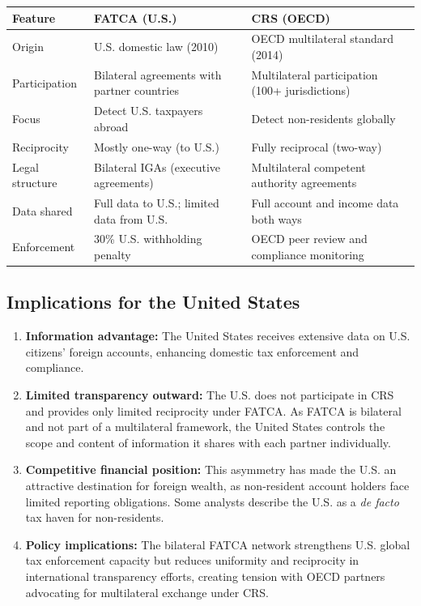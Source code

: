 \documentclass[12pt]{article}
\begin{document}
\begin{table}[h!]
\centering
\begin{tabular}{p{3.2cm} p{5.3cm} p{5.3cm}}
\toprule
\textbf{Feature} & \textbf{FATCA (U.S.)} & \textbf{CRS (OECD)} \\
\midrule
Origin & U.S. domestic law (2010) & OECD multilateral standard (2014) \\
Participation & Bilateral agreements with partner countries & Multilateral participation (100+ jurisdictions) \\
Focus & Detect U.S. taxpayers abroad & Detect non-residents globally \\
Reciprocity & Mostly one-way (to U.S.) & Fully reciprocal (two-way) \\
Legal structure & Bilateral IGAs (executive agreements) & Multilateral competent authority agreements \\
Data shared & Full data to U.S.; limited data from U.S. & Full account and income data both ways \\
Enforcement & 30\% U.S. withholding penalty & OECD peer review and compliance monitoring \\
\bottomrule
\end{tabular}
\end{table}

\subsection{Implications for the United States}
\begin{enumerate}
    \item \textbf{Information advantage:} The United States receives extensive data on U.S. citizens’ foreign accounts, enhancing domestic tax enforcement and compliance.
    \item \textbf{Limited transparency outward:} The U.S. does not participate in CRS and provides only limited reciprocity under FATCA. As FATCA is bilateral and not part of a multilateral framework, the United States controls the scope and content of information it shares with each partner individually.
    \item \textbf{Competitive financial position:} This asymmetry has made the U.S. an attractive destination for foreign wealth, as non-resident account holders face limited reporting obligations. Some analysts describe the U.S. as a \textit{de facto} tax haven for non-residents.
    \item \textbf{Policy implications:} The bilateral FATCA network strengthens U.S. global tax enforcement capacity but reduces uniformity and reciprocity in international transparency efforts, creating tension with OECD partners advocating for multilateral exchange under CRS.
\end{enumerate}
\end{document}
